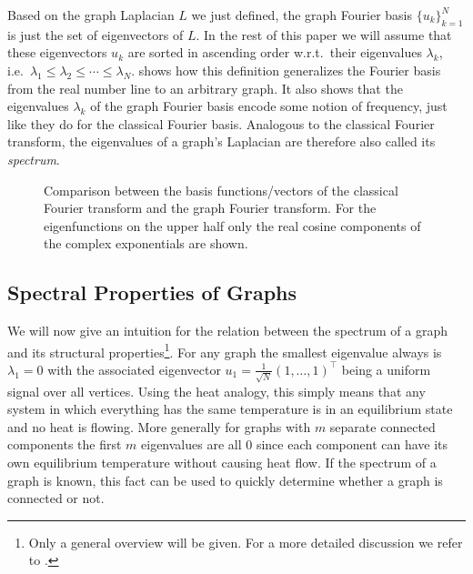 Based on the graph Laplacian $L$ we just defined, the graph Fourier basis ${\{ u_k \}}_{k = 1}^{N}$ is just the set of eigenvectors of $L$.
In the rest of this paper we will assume that these eigenvectors $u_k$ are sorted in ascending order w.r.t.\  their eigenvalues $\lambda_k$, i.e.\  $\lambda_1 \leq \lambda_2 \leq \cdots \leq \lambda_N$.
 shows how this definition generalizes the Fourier basis from the real number line to an arbitrary graph.
It also shows that the eigenvalues $\lambda_k$ of the graph Fourier basis encode some notion of frequency, just like they do for the classical Fourier basis.
Analogous to the classical Fourier transform, the eigenvalues of a graph's Laplacian are therefore also called its \textit{spectrum}.
\begin{figure}[ht]
	\centering
	\caption{%
		Comparison between the basis functions/vectors of the classical Fourier transform and the graph Fourier transform.
		For the eigenfunctions on the upper half only the real cosine components of the complex exponentials are shown.
	}\label{fig:sgt:graphFourier}
\end{figure}

\subsection{Spectral Properties of Graphs}%
\label{sec:sgt:spectrum}

We will now give an intuition for the relation between the spectrum of a graph and its structural properties\footnote{%
	Only a general overview will be given. For a more detailed discussion we refer to \citet{Shuman2013}.
}.
For any graph the smallest eigenvalue always is $\lambda_1 = 0$ with the associated eigenvector $u_1 = \frac{1}{\sqrt{N}} {(1, \dots, 1)}^\top$ being a uniform signal over all vertices.
Using the heat analogy, this simply means that any system in which everything has the same temperature is in an equilibrium state and no heat is flowing.
More generally for graphs with $m$ separate connected components the first $m$ eigenvalues are all $0$ since each component can have its own equilibrium temperature without causing heat flow.
If the spectrum of a graph is known, this fact can be used to quickly determine whether a graph is connected or not.

